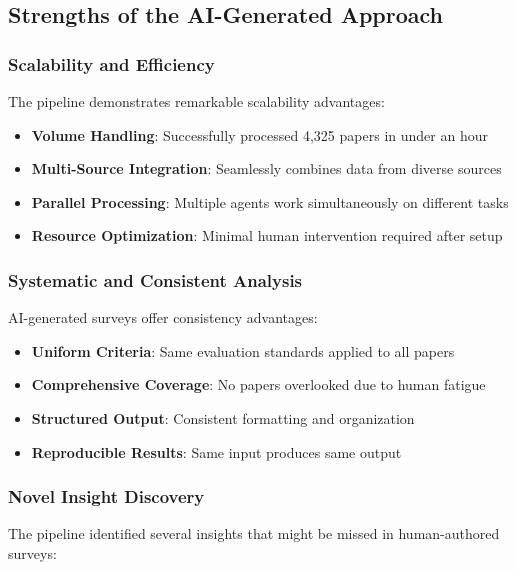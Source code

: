 \subsection{Strengths of the AI-Generated Approach}

\subsubsection{Scalability and Efficiency}

The pipeline demonstrates remarkable scalability advantages:

\begin{itemize}
    \item \textbf{Volume Handling}: Successfully processed 4,325 papers in under an hour
    \item \textbf{Multi-Source Integration}: Seamlessly combines data from diverse sources
    \item \textbf{Parallel Processing}: Multiple agents work simultaneously on different tasks
    \item \textbf{Resource Optimization}: Minimal human intervention required after setup
\end{itemize}

\subsubsection{Systematic and Consistent Analysis}

AI-generated surveys offer consistency advantages:

\begin{itemize}
    \item \textbf{Uniform Criteria}: Same evaluation standards applied to all papers
    \item \textbf{Comprehensive Coverage}: No papers overlooked due to human fatigue
    \item \textbf{Structured Output}: Consistent formatting and organization
    \item \textbf{Reproducible Results}: Same input produces same output
\end{itemize}

\subsubsection{Novel Insight Discovery}

The pipeline identified several insights that might be missed in human-authored surveys:

